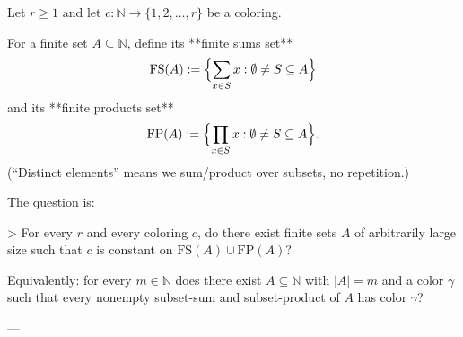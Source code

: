 Let $r\ge 1$ and let $c:\mathbb N\to\{1,2,\dots,r\}$ be a coloring.

For a finite set $A\subseteq\mathbb N$, define its **finite sums set**
\[
\mathrm{FS}(A):=\Bigl\{\sum_{x\in S} x: \emptyset\ne S\subseteq A\Bigr\}
\]
and its **finite products set**
\[
\mathrm{FP}(A):=\Bigl\{\prod_{x\in S} x: \emptyset\ne S\subseteq A\Bigr\}.
\]
(“Distinct elements” means we sum/product over subsets, no repetition.)

The question is:

> For every $r$ and every coloring $c$, do there exist finite sets $A$ of arbitrarily large size such that $c$ is constant on $\mathrm{FS}(A)\cup \mathrm{FP}(A)$?

Equivalently: for every $m\in\mathbb N$ does there exist $A\subseteq\mathbb N$ with $|A|=m$ and a color $\gamma$ such that every nonempty subset-sum and subset-product of $A$ has color $\gamma$?

---
